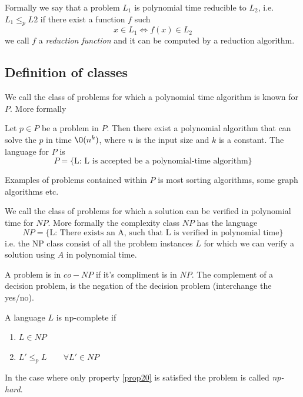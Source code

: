 \documentclass[10pt]{article}
\begin{document}
Formally we say that a problem $L_1$ is polynomial time reducible to $L_2$, i.e. $L_1 \leq_p L2$ if there exist a function $f$ such
\begin{equation}
  x \in L_1 \Leftrightarrow f(x) \in L_2 \label{eq15}
\end{equation}
we call $f$ a \emph{reduction function} and it can be computed by a reduction algorithm.



\subsection{Definition of classes} %
\label{sub:definition_of_classes}

We call the class of problems for which a polynomial time algorithm is known for $P$. More formally  
\begin{definition}
Let $p \in P$ be a problem in $P$. Then there exist a polynomial algorithm that can solve the $p$ in time $\O(n^k)$, where $n$ is the input size and $k$ is a constant. The language for $P$ is
\begin{equation}
  P = \{\text{L: L is accepted be a polynomial-time algorithm}\}
\end{equation}
\end{definition}
Examples of problems contained within $P$ is most sorting algorithms, some graph algorithms etc.

We call the class of problems for which a solution can be verified in polynomial time for $NP$. More formally the complexity class $NP$ has the language
\begin{equation}
  NP = \{\text{L: There exists an A, such that L is verified in polynomial time}\}
\end{equation}
i.e. the NP class consist of all the problem instances $L$ for which we can verify a solution using $A$ in polynomial time.

A problem is in $co-NP$ if it's compliment is in $NP$. The complement of a decision problem, is the negation of the decision problem (interchange the yes/no). 

A language $L$ is np-complete if 
\begin{enumerate}
  \item $L \in NP$
  \item $L' \leq_p L \qquad \forall L' \in NP$ \label{prop20}
\end{enumerate}
In the case where only property \ref{prop20} is satisfied the problem is called \emph{np-hard}.
\end{document}
